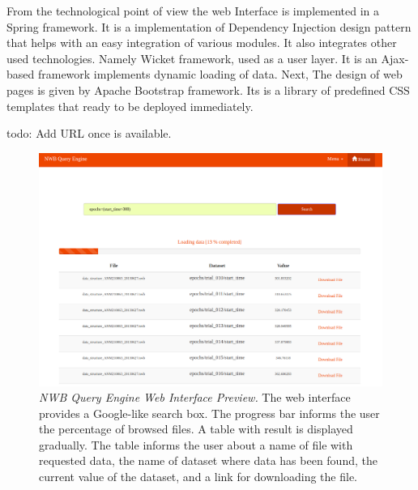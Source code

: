\documentclass[utf8]{frontiersSCNS} %
\begin{document}
From the technological point of view the web Interface is implemented in a Spring framework. It is a implementation of Dependency Injection design pattern that helps with an easy integration of various modules. It also integrates other used technologies. Namely Wicket framework, used as a user layer. It is an Ajax-based framework implements dynamic loading of data. Next, The design of web pages is given by  Apache Bootstrap framework. Its is a library of predefined CSS templates that ready to be deployed immediately.

todo: Add URL once is available.

\begin{figure}
  \includegraphics[width=17cm]{nwb-query-engine-web}
\caption{\emph{NWB Query Engine Web Interface Preview.} The web interface provides a Google-like search box. The progress bar informs the user the percentage of browsed files. A table with result is displayed gradually. The table informs the user about a name of file with requested data, the name of dataset where data has been found, the current value of the dataset, and a link for downloading the file.}
\label{fig:web-interface}
\end{figure}
\end{document}
